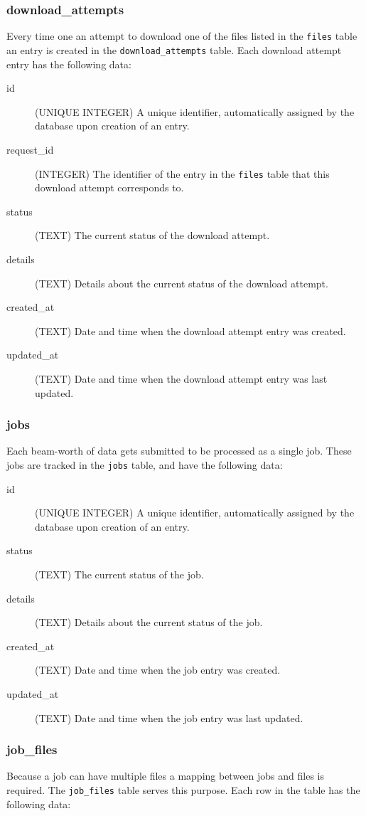 \subsubsection{download\_attempts}
Every time one an attempt to download one of the files listed in the \texttt{files} table an entry is created in the \texttt{download\_attempts} table. Each download attempt entry has the following data:

\begin{description}
    \item[id] (UNIQUE INTEGER)  A unique identifier, automatically assigned by the database upon creation of an entry.
    \item[request\_id] (INTEGER) The identifier of the entry in the \texttt{files} table that this download attempt corresponds to.
    \item[status] (TEXT) The current status of the download attempt.
    \item[details] (TEXT) Details about the current status of the download attempt.
    \item[created\_at] (TEXT) Date and time when the download attempt entry was created.
    \item[updated\_at] (TEXT) Date and time when the download attempt entry was last updated.
\end{description}

\subsubsection{jobs}
Each beam-worth of data gets submitted to be processed as a single job. These jobs are tracked in the \texttt{jobs} table, and have the following data:

\begin{description}
    \item[id] (UNIQUE INTEGER)  A unique identifier, automatically assigned by the database upon creation of an entry.
    \item[status] (TEXT) The current status of the job.
    \item[details] (TEXT) Details about the current status of the job.
    \item[created\_at] (TEXT) Date and time when the job entry was created.
    \item[updated\_at] (TEXT) Date and time when the job entry was last updated.
\end{description}

\subsubsection{job\_files}
Because a job can have multiple files a mapping between jobs and files is required. The \texttt{job\_files} table serves this purpose. Each row in the table has the following data:


